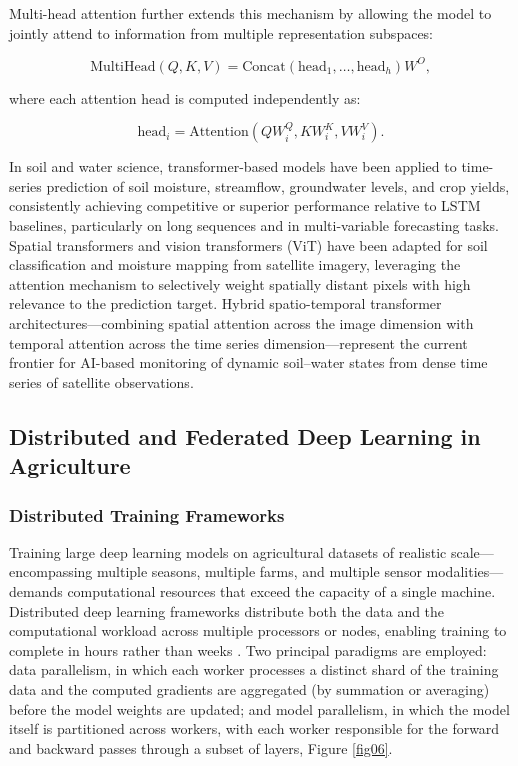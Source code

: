 \documentclass[land,article,submit,pdftex,moreauthors]{Definitions/mdpi}
\numberwithin{equation}{section}
\begin{document}
Multi-head attention further extends this mechanism by allowing the model to jointly attend to information from multiple representation subspaces:

\begin{equation}
\text{MultiHead}(Q,K,V)
=
\text{Concat}
(\text{head}_1,\dots,\text{head}_h)W^O,
\end{equation}

where each attention head is computed independently as:

\begin{equation}
\text{head}_i
=
\text{Attention}
(QW_i^Q,KW_i^K,VW_i^V).
\end{equation}

In soil and water science, transformer-based models have been applied to time-series prediction of soil moisture, streamflow, groundwater levels, and crop yields, consistently achieving competitive or superior performance relative to LSTM baselines, particularly on long sequences and in multi-variable forecasting tasks. Spatial transformers and vision transformers (ViT) \citep{dosovitskiy2021image} have been adapted for soil classification and moisture mapping from satellite imagery, leveraging the attention mechanism to selectively weight spatially distant pixels with high relevance to the prediction target. Hybrid spatio-temporal transformer architectures---combining spatial attention across the image dimension with temporal attention across the time series dimension---represent the current frontier for AI-based monitoring of dynamic soil--water states from dense time series of satellite observations.

\subsection{Distributed and Federated Deep Learning in Agriculture}

\subsubsection{Distributed Training Frameworks}

Training large deep learning models on agricultural datasets of realistic scale---encompassing multiple seasons, multiple farms, and multiple sensor modalities---demands computational resources that exceed the capacity of a single machine. Distributed deep learning frameworks distribute both the data and the computational workload across multiple processors or nodes, enabling training to complete in hours rather than weeks \citep{ben2019demystifying}. Two principal paradigms are employed: data parallelism, in which each worker processes a distinct shard of the training data and the computed gradients are aggregated (by summation or averaging) before the model weights are updated; and model parallelism, in which the model itself is partitioned across workers, with each worker responsible for the forward and backward passes through a subset of layers, Figure \ref{fig06}.
\end{document}
